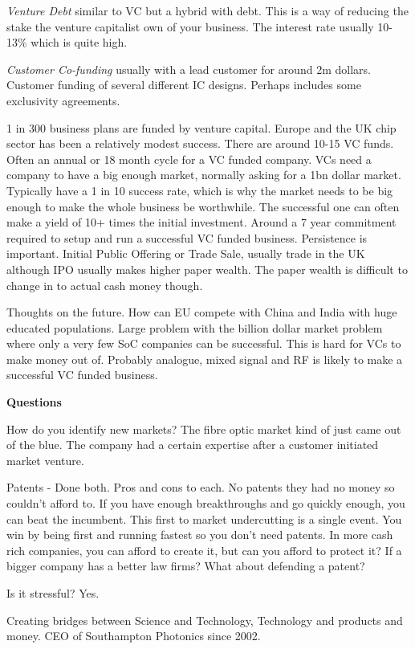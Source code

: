 \textit{Venture Debt} similar to VC but a hybrid with debt. This is a way of reducing the stake the venture capitalist own of your business. The interest rate usually 10-13\% which is quite high.

\textit{Customer Co-funding} usually with a lead customer for around 2m dollars. Customer funding of several different IC designs. Perhaps includes some exclusivity agreements.

1 in 300 business plans are funded by venture capital. Europe and the UK chip sector has been a relatively modest success. There are around 10-15 VC funds. Often an annual or 18 month cycle for a VC funded company. VCs need a company to have a big enough market, normally asking for a 1bn dollar market. Typically have a 1 in 10 success rate, which is why the market needs to be big enough to make the whole business be worthwhile. The successful one can often make a yield of 10+ times the initial investment. Around a 7 year commitment required to setup and run a successful VC funded business. Persistence is important. Initial Public Offering or Trade Sale, usually trade in the UK although IPO usually makes higher paper wealth. The paper wealth is difficult to change in to actual cash money though. 

Thoughts on the future. How can EU compete with China and India with huge educated populations. Large problem with the billion dollar market problem where only a very few SoC companies can be successful. This is hard for VCs to make money out of. Probably analogue, mixed signal and RF is likely to make a successful VC funded business.

\textbf{Questions}

How do you identify new markets? The fibre optic market kind of just came out of the blue. The company had a certain expertise after a customer initiated market venture.

Patents - Done both. Pros and cons to each. No patents they had no money so couldn't afford to. If you have enough breakthroughs and go quickly enough, you can beat the incumbent. This first to market undercutting is a single event. You win by being first and running fastest so you don't need patents. In more cash rich companies, you can afford to create it, but can you afford to protect it? If a bigger company has a better law firms? What about defending a patent? 

Is it stressful? Yes.

Creating bridges between Science and Technology, Technology and products and money. CEO of Southampton Photonics since 2002. 

